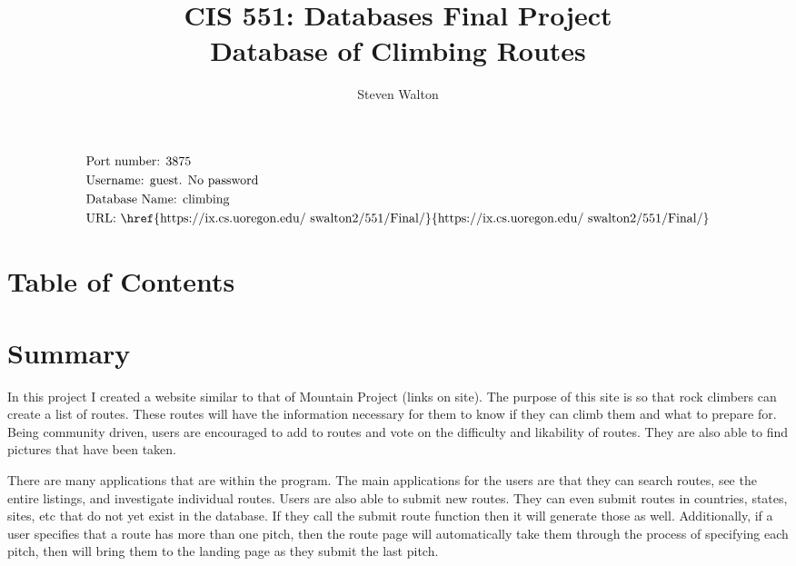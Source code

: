 \documentclass[12pt,letter]{article}
\begin{document}
\title{CIS 551: Databases Final Project\\
\large Database of Climbing Routes}
\author{Steven Walton}
\maketitle

\section*{}
\begin{align*}
    &\text{Port number: }3875 \\
    &\text{Username: guest. No password}\\
    &\text{Database Name: climbing}\\
    &\text{URL:
    \href{https://ix.cs.uoregon.edu/~swalton2/551/Final/}{https://ix.cs.uoregon.edu/~swalton2/551/Final/}}\\
\end{align*}
\newpage
\section{Table of Contents}

\section{Summary}
In this project I created a website similar to that of Mountain Project (links
on site). The purpose of this site is so that rock climbers can create a list of
routes. These routes will have the information necessary for them to know if
they can climb them and what to prepare for. Being community driven, users are
encouraged to add to routes and vote on the difficulty and likability of routes. 
They are also able to find pictures that have been taken. 

There are many applications that are within the program. The main applications
for the users are that they can search routes, see the entire listings, and
investigate individual routes. Users are also able to submit new routes. They
can even submit routes in countries, states, sites, etc that do not yet exist in
the database. If they call the submit route function then it will generate those
as well. Additionally, if a user specifies that a route has more than one pitch,
then the route page will automatically take them through the process of
specifying each pitch, then will bring them to the landing page as they submit
the last pitch. 
\end{document}
